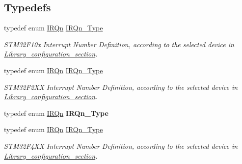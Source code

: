 \subsection*{Typedefs}
\begin{DoxyCompactItemize}
\item 
\hypertarget{group___configuration__section__for___c_m_s_i_s_gac3af4a32370fb28c4ade8bf2add80251}{typedef enum \hyperlink{group___configuration__section__for___c_m_s_i_s_ga666eb0caeb12ec0e281415592ae89083}{I\-R\-Qn} \hyperlink{group___configuration__section__for___c_m_s_i_s_gac3af4a32370fb28c4ade8bf2add80251}{I\-R\-Qn\-\_\-\-Type}}\label{group___configuration__section__for___c_m_s_i_s_gac3af4a32370fb28c4ade8bf2add80251}

\begin{DoxyCompactList}\small\item\em S\-T\-M32\-F10x Interrupt Number Definition, according to the selected device in \hyperlink{group___library__configuration__section}{Library\-\_\-configuration\-\_\-section}. \end{DoxyCompactList}\item 
\hypertarget{group___configuration__section__for___c_m_s_i_s_gac3af4a32370fb28c4ade8bf2add80251}{typedef enum \hyperlink{group___configuration__section__for___c_m_s_i_s_ga666eb0caeb12ec0e281415592ae89083}{I\-R\-Qn} \hyperlink{group___configuration__section__for___c_m_s_i_s_gac3af4a32370fb28c4ade8bf2add80251}{I\-R\-Qn\-\_\-\-Type}}\label{group___configuration__section__for___c_m_s_i_s_gac3af4a32370fb28c4ade8bf2add80251}

\begin{DoxyCompactList}\small\item\em S\-T\-M32\-F2\-X\-X Interrupt Number Definition, according to the selected device in \hyperlink{group___library__configuration__section}{Library\-\_\-configuration\-\_\-section}. \end{DoxyCompactList}\item 
\hypertarget{group___configuration__section__for___c_m_s_i_s_gac3af4a32370fb28c4ade8bf2add80251}{typedef enum \hyperlink{group___configuration__section__for___c_m_s_i_s_ga666eb0caeb12ec0e281415592ae89083}{I\-R\-Qn} {\bfseries I\-R\-Qn\-\_\-\-Type}}\label{group___configuration__section__for___c_m_s_i_s_gac3af4a32370fb28c4ade8bf2add80251}

\item 
\hypertarget{group___configuration__section__for___c_m_s_i_s_gac3af4a32370fb28c4ade8bf2add80251}{typedef enum \hyperlink{group___configuration__section__for___c_m_s_i_s_ga666eb0caeb12ec0e281415592ae89083}{I\-R\-Qn} \hyperlink{group___configuration__section__for___c_m_s_i_s_gac3af4a32370fb28c4ade8bf2add80251}{I\-R\-Qn\-\_\-\-Type}}\label{group___configuration__section__for___c_m_s_i_s_gac3af4a32370fb28c4ade8bf2add80251}

\begin{DoxyCompactList}\small\item\em S\-T\-M32\-F4\-X\-X Interrupt Number Definition, according to the selected device in \hyperlink{group___library__configuration__section}{Library\-\_\-configuration\-\_\-section}. \end{DoxyCompactList}\end{DoxyCompactItemize}
